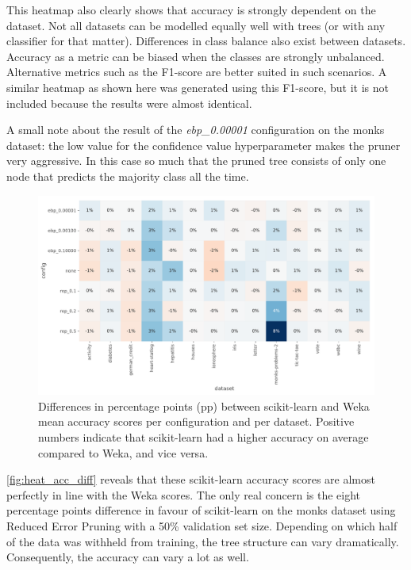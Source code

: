 This heatmap also clearly shows that accuracy is strongly dependent on the dataset. Not all datasets can be modelled equally well with trees (or with any classifier for that matter). Differences in class balance also exist between datasets. Accuracy as a metric can be biased when the classes are strongly unbalanced. Alternative metrics such as the F1-score are better suited in such scenarios. A similar heatmap as shown here was generated using this F1-score, but it is not included because the results were almost identical.

A small note about the result of the \emph{ebp\_0.00001} configuration on the monks dataset: the low value for the confidence value hyperparameter makes the pruner very aggressive. In this case so much that the pruned tree consists of only one node that predicts the majority class all the time.

\begin{figure}[htp]
    \includegraphics[width=\textwidth]{img/heatmap_accuracy_diff.pdf}
    \caption{Differences in percentage points (pp) between scikit-learn and Weka mean accuracy scores per configuration and per dataset. Positive numbers indicate that scikit-learn had a higher accuracy on average compared to Weka, and vice versa.}%
    \label{fig:heat_acc_diff}
\end{figure}

\autoref{fig:heat_acc_diff} reveals that these scikit-learn accuracy scores are almost perfectly in line with the Weka scores. The only real concern is the eight percentage points difference in favour of scikit-learn on the monks dataset using Reduced Error Pruning with a 50\% validation set size. Depending on which half of the data was withheld from training, the tree structure can vary dramatically. Consequently, the accuracy can vary a lot as well.

